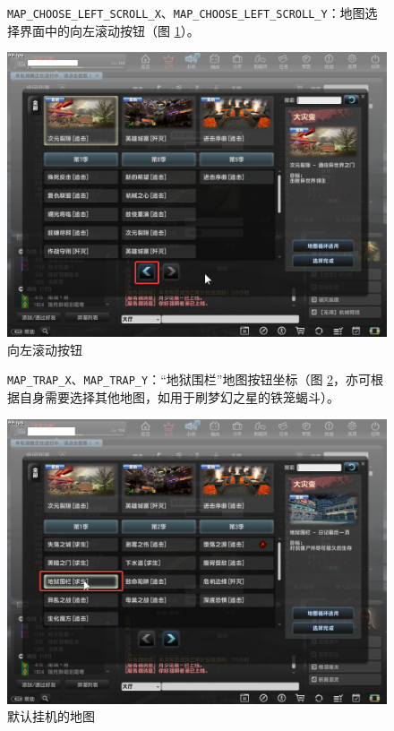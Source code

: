 \begin{figure}[H]
    \Centering
    \parbox[l]{\textwidth}{\lstinline{MAP_CHOOSE_LEFT_SCROLL_X}、\lstinline{MAP_CHOOSE_LEFT_SCROLL_Y}：地图选择界面中的向左滚动按钮（图 \ref{ch2fig-left-scroll}）。}
    \includegraphics[width=\textwidth]{docs/assets/left_scroll.png}
    \caption{向左滚动按钮}
    \label{ch2fig-left-scroll}
\end{figure}

\begin{figure}[H]
    \Centering
    \parbox[l]{\textwidth}{\lstinline{MAP_TRAP_X}、\lstinline{MAP_TRAP_Y}：“地狱围栏”地图按钮坐标（图 \ref{ch2fig-map-trap}，亦可根据自身需要选择其他地图，如用于刷梦幻之星的铁笼蝎斗）。}
    \includegraphics[width=\textwidth]{docs/assets/map_trap.png}
    \caption{默认挂机的地图}
    \label{ch2fig-map-trap}
\end{figure}

